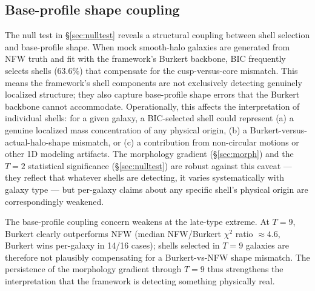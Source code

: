 \documentclass[linenumbers]{aastex701}
\begin{document}
\subsection{Base-profile shape coupling}\label{sec:coupling}

The null test in \S\ref{sec:nulltest} reveals a structural coupling between shell selection and base-profile shape. When mock smooth-halo galaxies are generated from NFW truth and fit with the framework's Burkert backbone, BIC frequently selects shells (63.6\%) that compensate for the cusp-versus-core mismatch. This means the framework's shell components are not exclusively detecting genuinely localized structure; they also capture base-profile shape errors that the Burkert backbone cannot accommodate. Operationally, this affects the interpretation of individual shells: for a given galaxy, a BIC-selected shell could represent (a) a genuine localized mass concentration of any physical origin, (b) a Burkert-versus-actual-halo-shape mismatch, or (c) a contribution from non-circular motions or other 1D modeling artifacts. The morphology gradient (\S\ref{sec:morph}) and the $T=2$ statistical significance (\S\ref{sec:nulltest}) are robust against this caveat --- they reflect that whatever shells are detecting, it varies systematically with galaxy type --- but per-galaxy claims about any specific shell's physical origin are correspondingly weakened.

The base-profile coupling concern weakens at the late-type extreme. At $T=9$, Burkert clearly outperforms NFW (median NFW/Burkert $\chi^2$ ratio $\approx 4.6$, Burkert wins per-galaxy in 14/16 cases); shells selected in $T=9$ galaxies are therefore not plausibly compensating for a Burkert-vs-NFW shape mismatch. The persistence of the morphology gradient through $T=9$ thus strengthens the interpretation that the framework is detecting something physically real.
\end{document}
